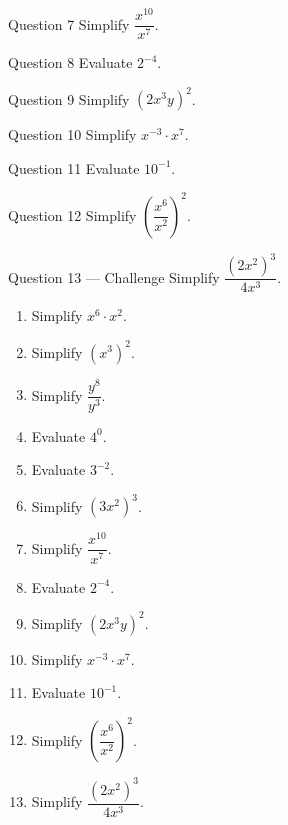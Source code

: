 \documentclass[11pt]{article}
\begin{document}
\begin{qbox}{Question 7}
Simplify $\dfrac{x^{10}}{x^{7}}$.\workspace{2.4cm}
\end{qbox}

\begin{qbox}{Question 8}
Evaluate $2^{-4}$.\workspace{2.4cm}
\end{qbox}

\begin{qbox}{Question 9}
Simplify $(2x^3y)^2$.\workspace{2.4cm}
\end{qbox}

\begin{qbox}{Question 10}
Simplify $x^{-3}\cdot x^{7}$.\workspace{2.4cm}
\end{qbox}

\begin{qbox}{Question 11}
Evaluate $10^{-1}$.\workspace{2.4cm}
\end{qbox}

\begin{qbox}{Question 12}
Simplify $\left(\dfrac{x^6}{x^2}\right)^2$.\workspace{2.4cm}
\end{qbox}

\begin{qbox}{Question 13 --- Challenge}
Simplify $\dfrac{(2x^2)^3}{4x^3}$.\workspace{3cm}
\end{qbox}

\clearpage
{}

\begin{recapbox}
\begin{multicols}{2}
\small
\begin{enumerate}[leftmargin=*,itemsep=3pt]
  \item Simplify $x^6\cdot x^2$.
  \item Simplify $(x^3)^2$.
  \item Simplify $\dfrac{y^8}{y^3}$.
  \item Evaluate $4^0$.
  \item Evaluate $3^{-2}$.
  \item Simplify $(3x^2)^3$.
  \item Simplify $\dfrac{x^{10}}{x^{7}}$.
  \item Evaluate $2^{-4}$.
  \item Simplify $(2x^3y)^2$.
  \item Simplify $x^{-3}\cdot x^{7}$.
  \item Evaluate $10^{-1}$.
  \item Simplify $\left(\dfrac{x^6}{x^2}\right)^2$.
  \item Simplify $\dfrac{(2x^2)^3}{4x^3}$.
\end{enumerate}
\end{multicols}
\end{recapbox}
\end{document}
